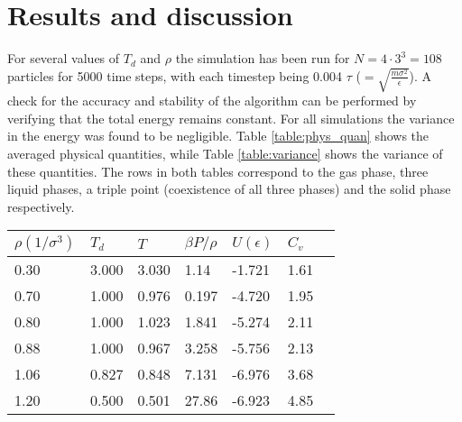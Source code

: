 \section{Results and discussion}
For several values of $T_d$ and $\rho$ the simulation has been run for $N = 4 \cdot 3^3 = 108$ particles for 5000 time steps, with each timestep being 0.004 $\tau$ ($=\sqrt{\frac{m\sigma^2}{\epsilon}}$). A check for the accuracy and stability of the algorithm can be performed by verifying that the total energy remains constant. For all simulations the variance in the energy was found to be negligible.
Table \ref{table:phys_quan} shows the averaged physical quantities, while Table \ref{table:variance} shows the variance of these quantities. The rows in both tables correspond to the gas phase, three liquid phases, a triple point (coexistence of all three phases) and the solid phase respectively.
\begin{center}
\centerfloat
{}
\begin{tabular}{lllllll}
\hline \hline
$\rho(1/\sigma^3)$ & $T_d$ & $T$ & $\beta P/\rho$ & $U(\epsilon)$ & $C_v$\\
\hline
0.30 & 3.000 & 3.030 & 1.14 & -1.721 & 1.61\\
0.70 & 1.000 & 0.976 & 0.197 & -4.720 & 1.95\\
0.80 & 1.000 & 1.023 & 1.841 & -5.274 & 2.11\\
0.88& 1.000 & 0.967 & 3.258 & -5.756 & 2.13\\
1.06& 0.827&0.848 & 7.131 & -6.976 & 3.68\\
1.20 & 0.500 & 0.501 & 27.86 & -6.923 & 4.85\\
\hline \hline
\end{tabular}
\vspace{-0.1cm}
\label{table:phys_quan}
\end{center}


